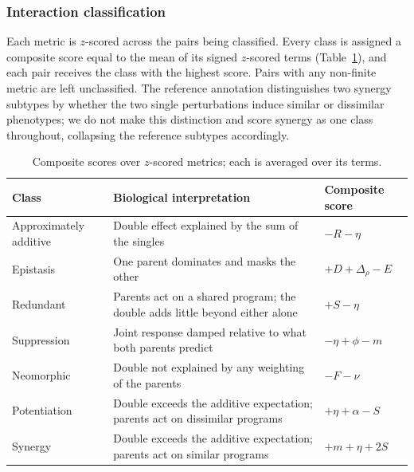 \subsubsection{Interaction classification}
\label{sec:gi-classification}

Each metric is $z$-scored across the pairs being classified. Every class is assigned a composite
score equal to the mean of its signed $z$-scored terms (Table~\ref{tab:gi-classes}), and each pair
receives the class with the highest score. Pairs with any non-finite metric are left unclassified.
The reference annotation distinguishes two synergy subtypes by whether the two single perturbations
induce similar or dissimilar phenotypes; we do not make this distinction and score synergy as one
class throughout, collapsing the reference subtypes accordingly.

\begin{table}[!htbp]
\centering
\small
\begin{tabular}{lp{7.2cm}l}
\toprule
Class & Biological interpretation & Composite score \\
\midrule
Approximately additive & Double effect explained by the sum of the singles & $-R - \eta$ \\[3pt]
Epistasis              & One parent dominates and masks the other & $+D + \Delta_{\!\rho} - E$ \\[3pt]
Redundant              & Parents act on a shared program; the double adds little beyond either alone & $+S - \eta$ \\[3pt]
Suppression            & Joint response damped relative to what both parents predict & $-\eta + \phi - m$ \\[3pt]
Neomorphic             & Double not explained by any weighting of the parents & $-F - \nu$ \\[3pt]
Potentiation           & Double exceeds the additive expectation; parents act on dissimilar programs & $+\eta + \alpha - S$ \\[3pt]
Synergy                & Double exceeds the additive expectation; parents act on similar programs & $+m + \eta + 2S$ \\
\bottomrule
\end{tabular}
\caption{Composite scores over $z$-scored metrics; each is averaged over its terms.}
\label{tab:gi-classes}
\end{table}
